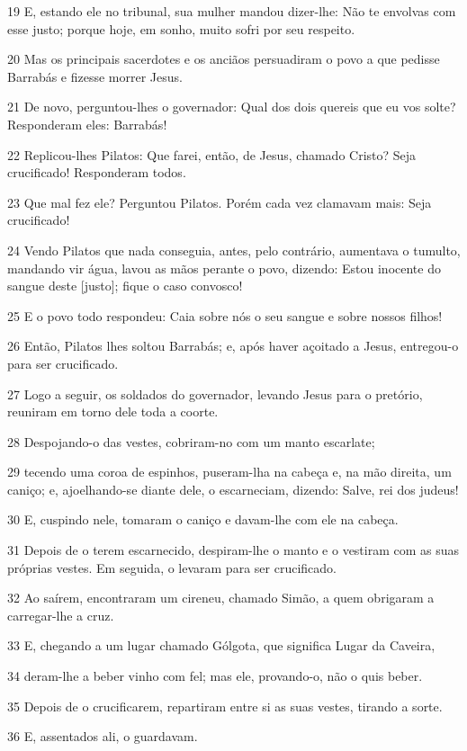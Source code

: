 \par 19 E, estando ele no tribunal, sua mulher mandou dizer-lhe: Não te envolvas com esse justo; porque hoje, em sonho, muito sofri por seu respeito.
\par 20 Mas os principais sacerdotes e os anciãos persuadiram o povo a que pedisse Barrabás e fizesse morrer Jesus.
\par 21 De novo, perguntou-lhes o governador: Qual dos dois quereis que eu vos solte? Responderam eles: Barrabás!
\par 22 Replicou-lhes Pilatos: Que farei, então, de Jesus, chamado Cristo? Seja crucificado! Responderam todos.
\par 23 Que mal fez ele? Perguntou Pilatos. Porém cada vez clamavam mais: Seja crucificado!
\par 24 Vendo Pilatos que nada conseguia, antes, pelo contrário, aumentava o tumulto, mandando vir água, lavou as mãos perante o povo, dizendo: Estou inocente do sangue deste [justo]; fique o caso convosco!
\par 25 E o povo todo respondeu: Caia sobre nós o seu sangue e sobre nossos filhos!
\par 26 Então, Pilatos lhes soltou Barrabás; e, após haver açoitado a Jesus, entregou-o para ser crucificado.
\par 27 Logo a seguir, os soldados do governador, levando Jesus para o pretório, reuniram em torno dele toda a coorte.
\par 28 Despojando-o das vestes, cobriram-no com um manto escarlate;
\par 29 tecendo uma coroa de espinhos, puseram-lha na cabeça e, na mão direita, um caniço; e, ajoelhando-se diante dele, o escarneciam, dizendo: Salve, rei dos judeus!
\par 30 E, cuspindo nele, tomaram o caniço e davam-lhe com ele na cabeça.
\par 31 Depois de o terem escarnecido, despiram-lhe o manto e o vestiram com as suas próprias vestes. Em seguida, o levaram para ser crucificado.
\par 32 Ao saírem, encontraram um cireneu, chamado Simão, a quem obrigaram a carregar-lhe a cruz.
\par 33 E, chegando a um lugar chamado Gólgota, que significa Lugar da Caveira,
\par 34 deram-lhe a beber vinho com fel; mas ele, provando-o, não o quis beber.
\par 35 Depois de o crucificarem, repartiram entre si as suas vestes, tirando a sorte.
\par 36 E, assentados ali, o guardavam.
